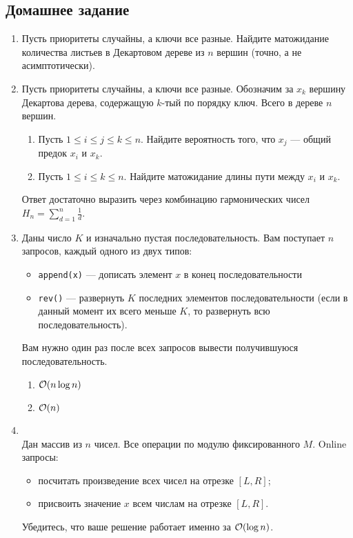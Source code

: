 
\subsection{Домашнее задание}
\begin{enumerate}

  \item
    Пусть приоритеты случайны, а ключи все разные. Найдите матожидание количества листьев в
    Декартовом дереве из $n$ вершин (точно, а не асимптотически).

  \item
    Пусть приоритеты случайны, а ключи все разные. Обозначим за $x_k$ вершину Декартова дерева,
    содержащую $k$-тый по порядку ключ. Всего в дереве $n$ вершин.
    \begin{enumerate}
      \item Пусть $1 \le i \le j \le k \le n$. Найдите вероятность того, что $x_j$ --- общий предок $x_i$ и $x_k$.
      \item Пусть $1 \le i \le k \le n$. Найдите матожидание длины пути между $x_i$ и $x_k$.
    \end{enumerate}
    Ответ достаточно выразить через комбинацию гармонических чисел $H_n = \sum\limits_{d = 1}^{n}\frac{1}{d}$.

  \item
    Даны число $K$ и изначально пустая последовательность. Вам поступает $n$ запросов, каждый одного из двух типов:
    \begin{itemize}
      \item \texttt{append(x)} --- дописать элемент $x$ в конец последовательности
      \item \texttt{rev()} ---
        развернуть $K$ последних элементов последовательности (если в данный момент их всего меньше $K$, то
        развернуть всю последовательность).
    \end{itemize}
    Вам нужно один раз после всех запросов вывести получившуюся последовательность.
    \begin{enumerate}
      \item $\mathcal{O}(n \log{n})$
      \item $\mathcal{O}(n)$
    \end{enumerate}

  \item {}\\
    Дан массив из $n$ чисел. Все операции по модулю фиксированного $M$. Online запросы:
	\begin{itemize}
		\item посчитать произведение всех чисел на отрезке $[L, R]$;
		\item присвоить значение $x$ всем числам на отрезке $[L, R]$.
	\end{itemize}
	Убедитесь, что ваше решение работает именно за $\mathcal{O}(\log n)$.


\end{enumerate}
